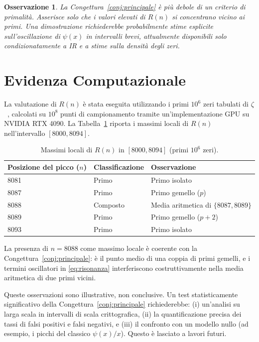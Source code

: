 \documentclass[11pt,a4paper]{article}
\newtheorem{osservazione}{Osservazione}
\begin{document}
\begin{osservazione}
La Congettura~\ref{conj:principale} \`e pi\`u debole di un criterio di primalit\`a.
Asserisce solo che i valori elevati di $R(n)$ si concentrano vicino ai primi. Una
dimostrazione richiederebbe probabilmente stime esplicite sull'oscillazione di
$\psi(x)$ in intervalli brevi, attualmente disponibili solo condizionatamente a IR
e a stime sulla densit\`a degli zeri.
\end{osservazione}

\section{Evidenza Computazionale}

La valutazione di $R(n)$ \`e stata eseguita utilizzando i primi $10^6$ zeri
tabulati di $\zeta$~\cite{odlyzko}, calcolati su $10^8$ punti di campionamento
tramite un'implementazione GPU su NVIDIA RTX 4090. La Tabella~\ref{tab:risultati}
riporta i massimi locali di $R(n)$ nell'intervallo $[8000, 8094]$.

\begin{table}[h]
\centering
\caption{Massimi locali di $R(n)$ in $[8000, 8094]$ (primi $10^6$ zeri).}
\vspace{2mm}
\label{tab:risultati}
\begin{tabular}{lll}
\toprule
\textbf{Posizione del picco ($n$)} & \textbf{Classificazione} & \textbf{Osservazione} \\
\midrule
8081 & Primo       & Primo isolato \\
8087 & Primo       & Primo gemello ($p$) \\
8088 & Composto    & Media aritmetica di $\{8087, 8089\}$ \\
8089 & Primo       & Primo gemello ($p+2$) \\
8093 & Primo       & Primo isolato \\
\bottomrule
\end{tabular}
\end{table}

La presenza di $n=8088$ come massimo locale \`e coerente con la
Congettura~\ref{conj:principale}: \`e il punto medio di una coppia di primi gemelli,
e i termini oscillatori in \eqref{eq:risonanza} interferiscono costruttivamente
nella media aritmetica di due primi vicini.

Queste osservazioni sono illustrative, non conclusive. Un test statisticamente
significativo della Congettura~\ref{conj:principale} richiederebbe:
(i) un'analisi su larga scala in intervalli di scala crittografica,
(ii) la quantificazione precisa dei tassi di falsi positivi e falsi negativi,
e (iii) il confronto con un modello nullo (ad esempio, i picchi del classico
$\psi(x)/x$). Questo \`e lasciato a lavori futuri.
\end{document}

